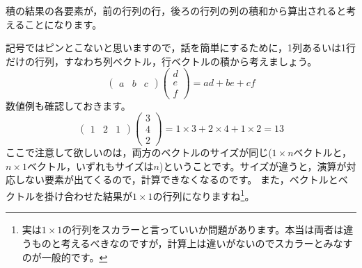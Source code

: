\documentclass{ltjsbook}
\begin{document}
積の結果の各要素が，前の行列の行，後ろの行列の列の積和から算出されると考えることになります。

記号ではピンとこないと思いますので，話を簡単にするために，1列あるいは1行だけの行列，すなわち列ベクトル，行ベクトルの積から考えましょう。
\[
    \begin{pmatrix} a & b & c \end{pmatrix}\begin{pmatrix} d\\e\\f \end{pmatrix} = ad + be + cf
\]
数値例も確認しておきます。
\[
    \begin{pmatrix}
        1 & 2 & 1
    \end{pmatrix}
    \begin{pmatrix}
        3 \\4\\2
    \end{pmatrix}
    =1\times 3 + 2 \times 4 + 1 \times 2 = 13
\]
ここで注意して欲しいのは，両方のベクトルのサイズが同じ($1\times n$ベクトルと，$n \times 1$ベクトル，いずれもサイズは$n$)ということです。サイズが違うと，演算が対応しない要素が出てくるので，計算できなくなるのです。
また，ベクトルとベクトルを掛け合わせた結果が$1 \times 1$の行列になりますね\footnote{実は$1\times 1$の行列をスカラーと言っていいか問題があります。本当は両者は違うものと考えるべきなのですが，計算上は違いがないのでスカラーとみなすのが一般的です。}。
\end{document}
